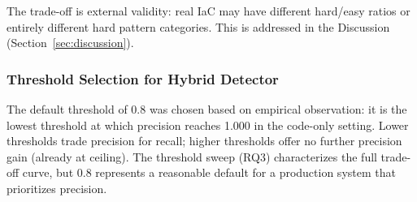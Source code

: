 The trade-off is external validity: real IaC may have different hard/easy ratios or entirely different hard pattern categories. This is addressed in the Discussion (Section~\ref{sec:discussion}).

\subsubsection{Threshold Selection for Hybrid Detector}

The default threshold of 0.8 was chosen based on empirical observation: it is the lowest threshold at which precision reaches 1.000 in the code-only setting. Lower thresholds trade precision for recall; higher thresholds offer no further precision gain (already at ceiling). The threshold sweep (RQ3) characterizes the full trade-off curve, but 0.8 represents a reasonable default for a production system that prioritizes precision.
